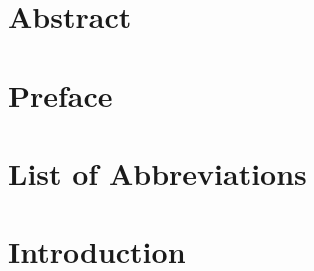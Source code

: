 \documentclass[a4paper,10pt,twoside]{report}
\author{\me}
\begin{document}
 

\normalsize



\chapter*{Abstract}\label{chapter:abstract}



\chapter*{Preface}\label{chapter:preface}



\tableofcontents








\chapter*{List of Abbreviations}



\chapter{Introduction}\label{chapter:introduction}
\setcounter{page}{0}



%
\end{document}
